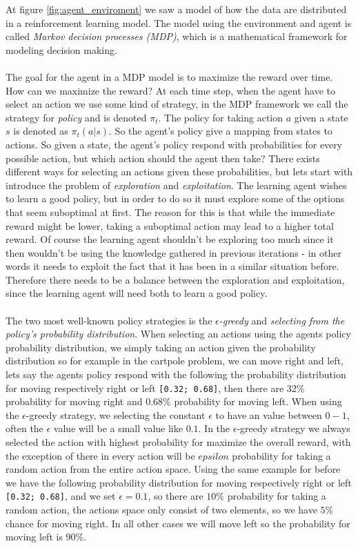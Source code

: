 \documentclass[11pt]{article}
\begin{document}
At figure \ref{fig:agent_enviroment} we saw a model of how the data are distributed in a reinforcement learning model. The model using the environment and agent is called \textit{Markov decision processes (MDP)}, which is a mathematical framework for modeling decision making. 
\\ \\
The goal for the agent in a MDP model is to maximize the reward over time. How can we maximize the reward? At each time step, when the agent have to select an action we use some kind of strategy, in the MDP framework we call the strategy for \textit{policy} and is denoted $\pi_{t}$. The policy for taking action $a$ given a state $s$ is denoted as $\pi_{t}(a|s)$. So the agent's policy give a mapping from states to actions.
So given a state, the agent's policy respond with probabilities for every possible action, but which action should the agent then take? There exists different ways for selecting an actions given these probabilities, but lets start with introduce the problem of \textit{exploration} and \textit{exploitation}.
The learning agent wishes to learn a good policy, but in order to do so it must explore
some of the options that seem suboptimal at first.
The reason for this is that while the immediate reward might be lower, taking a
suboptimal action may lead to a higher total reward.
Of course the learning agent shouldn't be exploring too much since it then wouldn't
be using the knowledge gathered in previous iterations - in other words it needs to
exploit the fact that it has been in a similar situation before.
Therefore there needs to be a balance between the exploration and exploitation, since
the learning agent will need both to learn a good policy.
\\ \\
The two most well-known policy strategies is the \textit{$\epsilon$-greedy} and \textit{selecting from the policy's probability distribution}. When selecting an actions using the agents policy probability distribution, we simply taking an action given the probability distribution so for example in the cartpole problem, we can move right and left, lets say the agents policy respond with the following the probability distribution for moving respectively right or left \texttt{[0.32; 0.68]}, then there are $32\%$ probability for moving right and $0.68\%$ probability for moving left.
When using the $\epsilon$-greedy strategy, we selecting the constant $\epsilon$ to have an value between $0 - 1$, often the $\epsilon$ value will be a small value like $0.1$.
In the $\epsilon$-greedy strategy we always selected the action with highest probability for maximize the overall reward, with the exception of there in every action will be $epsilon$ probability for taking a random action from the entire action space. Using the same example for before we have the following probability distribution for moving respectively right or left \texttt{[0.32; 0.68]}, and we set $\epsilon = 0.1$, so there are $10\%$ probability for taking a random action, the actions space only consist of two elements, so we have $5\%$ chance for moving right. In all other cases we will move left so the probability for moving left is $90\%$.


%
%
\end{document}
